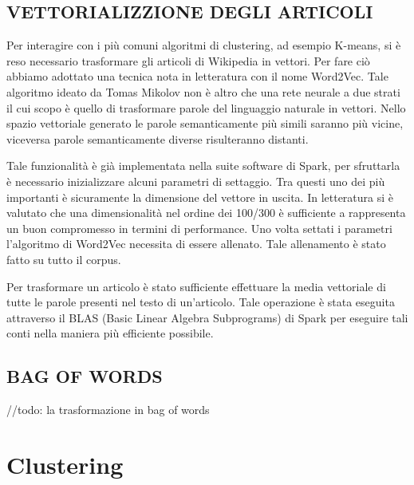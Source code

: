 \documentclass[
12pt, %
a4paper, %
oneside, %
headinclude,footinclude, %
BCOR5mm, %
]{scrartcl}
\begin{document}
	\subsection{VETTORIALIZZIONE DEGLI ARTICOLI}


        Per interagire con i più comuni algoritmi di clustering, ad esempio K-means, si è reso necessario trasformare
        gli articoli di Wikipedia in vettori.
        Per fare ciò abbiamo adottato una tecnica nota in letteratura con il nome Word2Vec. Tale algoritmo ideato da
        Tomas Mikolov non è altro che una rete neurale a due strati il cui scopo è quello di trasformare parole del
        linguaggio naturale in vettori. Nello spazio vettoriale generato le parole semanticamente più simili
        saranno più vicine, viceversa parole semanticamente diverse risulteranno distanti.

        Tale funzionalità è già implementata nella suite software di Spark,
        per sfruttarla è necessario inizializzare alcuni parametri di settaggio. Tra questi uno dei più importanti
        è sicuramente la dimensione del vettore in uscita. In letteratura si è valutato che una dimensionalità
        nel ordine dei 100/300 \cite{w2vdim}
        è sufficiente a rappresenta un buon compromesso in termini di performance.
        Uno volta settati i parametri l'algoritmo di Word2Vec necessita di essere allenato. Tale allenamento è stato
        fatto su tutto il corpus.

        Per trasformare un articolo è stato sufficiente effettuare la media vettoriale di tutte le parole presenti
        nel testo di un'articolo. Tale operazione è stata eseguita attraverso il BLAS (Basic Linear Algebra Subprograms)
        di Spark per eseguire tali conti nella maniera più efficiente possibile.




	\subsection{BAG OF WORDS}

		//todo: la trasformazione in bag of words



\section{Clustering}
\end{document}
